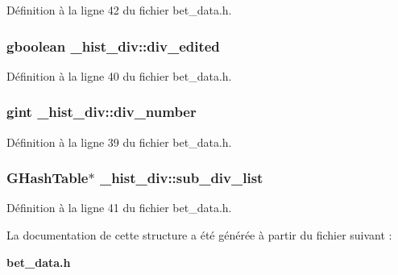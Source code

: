 Définition à la ligne 42 du fichier bet\_\-data.h.

\subsubsection[{div\_\-edited}]{\setlength{\rightskip}{0pt plus 5cm}gboolean {\bf \_\-hist\_\-div::div\_\-edited}}\label{struct__hist__div_ac1620dc53b32f9c7ba082e45c51987b0}


Définition à la ligne 40 du fichier bet\_\-data.h.

\subsubsection[{div\_\-number}]{\setlength{\rightskip}{0pt plus 5cm}gint {\bf \_\-hist\_\-div::div\_\-number}}\label{struct__hist__div_aa7df5b76f022037b8118d35c6ca78e9e}


Définition à la ligne 39 du fichier bet\_\-data.h.

\subsubsection[{sub\_\-div\_\-list}]{\setlength{\rightskip}{0pt plus 5cm}GHashTable$\ast$ {\bf \_\-hist\_\-div::sub\_\-div\_\-list}}\label{struct__hist__div_ab69bea8d8cef3a16e32e2d846643e3b9}


Définition à la ligne 41 du fichier bet\_\-data.h.



La documentation de cette structure a été générée à partir du fichier suivant :\begin{DoxyCompactItemize}
\item 
{\bf bet\_\-data.h}\end{DoxyCompactItemize}
